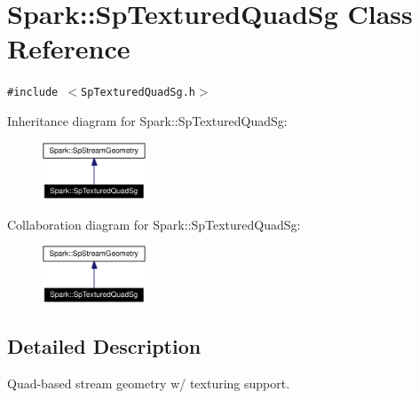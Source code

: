 \section{Spark::Sp\-Textured\-Quad\-Sg Class Reference}
\label{classSpark_1_1SpTexturedQuadSg}
{\tt \#include $<$Sp\-Textured\-Quad\-Sg.h$>$}

Inheritance diagram for Spark::Sp\-Textured\-Quad\-Sg:\begin{figure}[H]
\begin{center}
\leavevmode
\includegraphics[width=87pt]{classSpark_1_1SpTexturedQuadSg__inherit__graph}
\end{center}
\end{figure}
Collaboration diagram for Spark::Sp\-Textured\-Quad\-Sg:\begin{figure}[H]
\begin{center}
\leavevmode
\includegraphics[width=87pt]{classSpark_1_1SpTexturedQuadSg__coll__graph}
\end{center}
\end{figure}


\subsection{Detailed Description}
Quad-based stream geometry w/ texturing support. 

